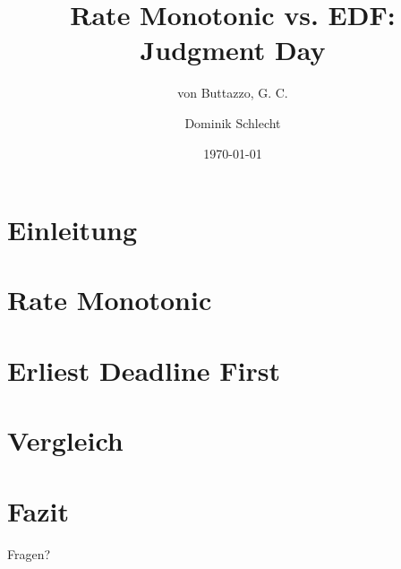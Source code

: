 \documentclass[unknownkeysallowed]{beamer}
\title{Rate Monotonic vs. EDF: Judgment Day}
\subtitle{von Buttazzo, G. C.}
\date{\today}
\author{Dominik Schlecht}
\institute[THI]{Technische Hochschule Ingolstadt}
\begin{document}
	\frame{\maketitle}
	\frame{\tableofcontents}
	
	\section{Einleitung}
	
	
	\section{Rate Monotonic}
	

	\section{Erliest Deadline First}
	
	
	\section{Vergleich}
	
	
	\section{Fazit}
	
	
	\begin{frame}{\subsecname}
		Fragen?
	\end{frame}
	
\end{document}

